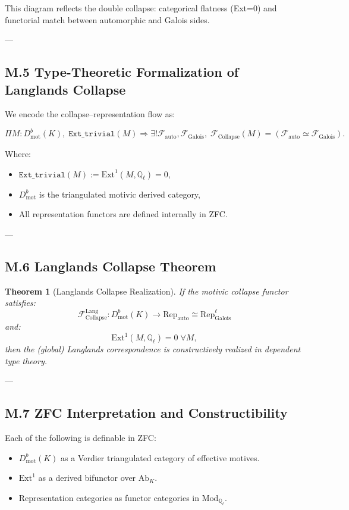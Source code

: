\documentclass[11pt]{article}
\newtheorem{theorem}{Theorem}[section]
\begin{document}
This diagram reflects the double collapse: categorical flatness (Ext=0) and functorial match between automorphic and Galois sides.

---

\subsection*{M.5 Type-Theoretic Formalization of Langlands Collapse}

We encode the collapse–representation flow as:

\[
\Pi M : D^b_{\mathrm{mot}}(K),\;
\texttt{Ext\_trivial}(M) \Rightarrow
\exists! \mathcal{F}_{\mathrm{auto}}, \mathcal{F}_{\mathrm{Galois}},\;
\mathcal{F}_{\mathrm{Collapse}}(M) = (\mathcal{F}_{\mathrm{auto}} \simeq \mathcal{F}_{\mathrm{Galois}}).
\]

Where:
\begin{itemize}
  \item $\texttt{Ext\_trivial}(M) := \mathrm{Ext}^1(M, \mathbb{Q}_\ell) = 0$,
  \item $D^b_{\mathrm{mot}}$ is the triangulated motivic derived category,
  \item All representation functors are defined internally in ZFC.
\end{itemize}

---

\subsection*{M.6 Langlands Collapse Theorem}

\begin{theorem}[Langlands Collapse Realization]
If the motivic collapse functor satisfies:
\[
\mathcal{F}_{\mathrm{Collapse}}^{\mathrm{Lang}} : D^b_{\mathrm{mot}}(K) \to \mathrm{Rep}_{\mathrm{auto}} \cong \mathrm{Rep}_\mathrm{Galois}^\ell
\]
and:
\[
\mathrm{Ext}^1(M, \mathbb{Q}_\ell) = 0 \; \forall M,
\]
then the (global) Langlands correspondence is constructively realized in dependent type theory.
\end{theorem}

---

\subsection*{M.7 ZFC Interpretation and Constructibility}

Each of the following is definable in ZFC:
\begin{itemize}
  \item $D^b_{\mathrm{mot}}(K)$ as a Verdier triangulated category of effective motives.
  \item $\mathrm{Ext}^1$ as a derived bifunctor over $\text{Ab}_K$.
  \item Representation categories as functor categories in $\text{Mod}_{\mathbb{Q}_\ell}$.
\end{itemize}
\end{document}
